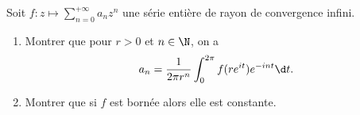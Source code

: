 \begin{enonce}
\begin{exercise}[ID={RMS135 E1471},subtitle={IMT MP 2024},tags={},difficulty={}]

Soit $f : z \mapsto \sum_{n=0}^{+\infty} a_n z^n$ une série entière de rayon de convergence infini.

\begin{enumerate}
  \item Montrer que pour $r > 0$ et $n \in \N$, on a
  \begin{equation*}
  a_n = \frac{1}{2\pi r^n} \int_0^{2\pi} f(re^{it}) e^{-int} \d t.
  \end{equation*}
  \item Montrer que si $f$ est bornée alors elle est constante.
\end{enumerate}

\end{exercise}
\begin{solution}
\end{solution}
\end{enonce}
